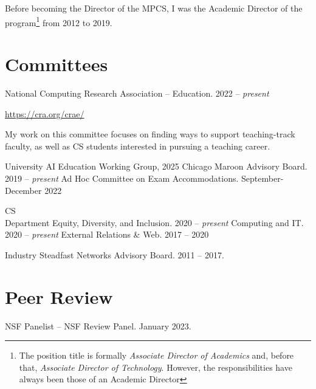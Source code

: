 \documentclass{resume}
\begin{document}
Before becoming the Director of the MPCS, I was the Academic Director of the program\footnote{The position title is formally \emph{Associate Director of Academics} and, before that, \emph{Associate Director of Technology}. However, the responsibilities have always been those of an Academic Director} from 2012 to 2019.

\section*{\hspace{-1cm}Committees}
\begin{category}{National}
\citembullet Computing Research Association -- Education. 2022 -- \emph{present}

\url{https://cra.org/crae/}

My work on this committee focuses on finding ways to support teaching-track faculty, as well as CS students interested in pursuing a teaching career.
\end{category}

\begin{category}{University}
\citembullet AI Education Working Group, 2025
\citembullet Chicago Maroon Advisory Board. 2019 -- \emph{present}
\citembullet Ad Hoc Committee on Exam Accommodations. September-December 2022
\end{category}

\begin{category}{CS\\Department}
\citembullet Equity, Diversity, and Inclusion. 2020 -- \emph{present}
\citembullet Computing and IT. 2020 -- \emph{present}
\citembullet External Relations \& Web. 2017 -- 2020
\end{category}

\begin{category}{Industry}
 \citembullet Steadfast Networks Advisory Board. 2011 -- 2017.
\end{category}




\section*{\hspace{-1cm}Peer Review}

\begin{category}{NSF}
 \citembullet Panelist -- NSF Review Panel. January 2023.
\end{category}
\end{document}
